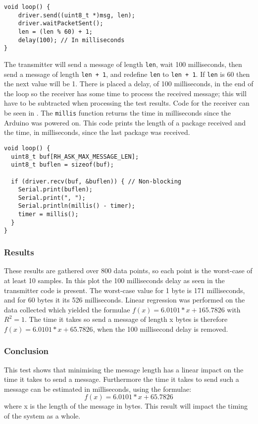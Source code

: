 \begin{lstlisting}[style=customc,float,floatplacement=!h,caption={The core of the transmitter code.},label={lst:transtestcore}]
void loop() {
    driver.send((uint8_t *)msg, len);
    driver.waitPacketSent();
    len = (len % 60) + 1;
    delay(100); // In milliseconds 
}
\end{lstlisting}

The transmitter will send a message of length \texttt{len}, wait 100 milliseconds, then send a message of length \texttt{len + 1}, and redefine \texttt{len} to \texttt{len + 1}.
If \texttt{len} is 60 then the next value will be 1. 
There is placed a delay, of 100 milliseconds, in the end of the loop so the receiver has some time to process the received message; this will have to be subtracted when processing the test results.
Code for the receiver can be seen in .
The \texttt{millis} function returns the time in milliseconds since the Arduino was powered on. 
This code prints the length of a package received and the time, in milliseconds, since the last package was received.

\begin{lstlisting}[style=customc,float,floatplacement=!h,caption={The core of the receiver code.},label={lst:recvtestcore}]
void loop() {
  uint8_t buf[RH_ASK_MAX_MESSAGE_LEN];
  uint8_t buflen = sizeof(buf);

  if (driver.recv(buf, &buflen)) { // Non-blocking
    Serial.print(buflen);
    Serial.print(", ");
    Serial.println(millis() - timer);
    timer = millis();
  }
}
\end{lstlisting}


\subsubsection*{Results}
These results are gathered over 800 data points, so each point is the worst-case of at least 10 samples. 
In this plot the 100 milliseconds delay as seen in the transmitter code is present.
The worst-case value for 1 byte is 171 milliseconds, and for 60 bytes it its 526 milliseconds. 
Linear regression was performed on the data collected which yielded the formulae $f(x)=6.0101 * x + 165.7826$ with $R^2 = 1$. 
The time it takes so send a message of length x bytes is therefore $f(x)=6.0101 * x + 65.7826$, when the 100 millisecond delay is removed.

\subsubsection*{Conclusion}
This test shows that minimising the message length has a linear impact on the time it takes to send a message. 
Furthermore the time it takes to send such a message can be estimated in milliseconds, using the formulae: 
\begin{equation}
f(x)=6.0101 * x + 65.7826 
\label{eq:timeToSendFormular}   
\end{equation}
where x is the length of the message in bytes. 
This result will impact the timing of the system as a whole.  
